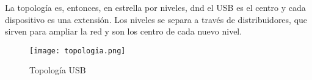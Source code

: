     La topología es, entonces, en estrella por niveles, dnd el \host USB es el
    centro y cada dispositivo es una extensión. Los niveles se separa a través
    de distribuidores, que sirven para ampliar la red y son los centro de cada
    nuevo nivel.

    \begin{figure}
	    \centering
		\texttt{[image: topologia.png]}
		\caption{Topología USB}
		\label{}
    \end{figure}

